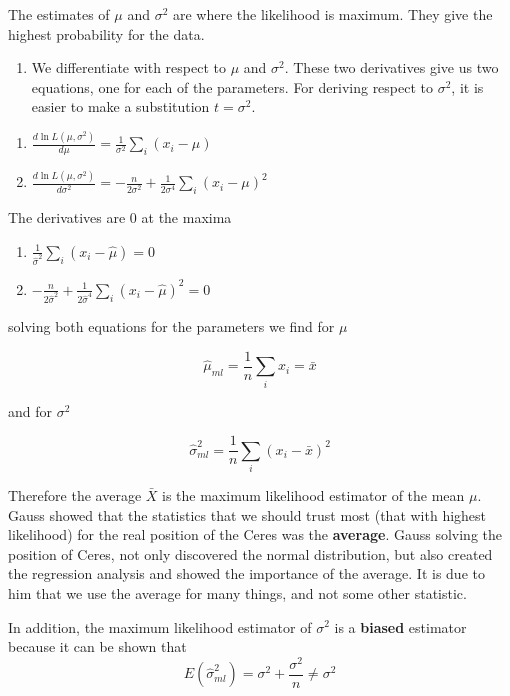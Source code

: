 \documentclass[
]{book}
\providecommand{\tightlist}{%
  \setlength{\itemsep}{0pt}\setlength{\parskip}{0pt}}
\begin{document}
The estimates of \(\mu\) and \(\sigma^2\) are where the likelihood is maximum. They give the highest probability for the data.

\begin{enumerate}
\def\labelenumi{\arabic{enumi}.}
\setcounter{enumi}{2}
\tightlist
\item
  We differentiate with respect to \(\mu\) and \(\sigma^2\). These two derivatives give us two equations, one for each of the parameters. For deriving respect to \(\sigma^2\), it is easier to make a substitution \(t=\sigma^2\).
\end{enumerate}

\begin{enumerate}
\def\labelenumi{\alph{enumi})}
\item
  \(\frac{d \ln L(\mu, \sigma^2)}{d\mu}=\frac{1}{\sigma^2} \sum_i(x_i-\mu)\)
\item
  \(\frac{d \ln L(\mu, \sigma^2)}{d\sigma^2}=-\frac{n}{2 \sigma^2}+\frac{1}{2\sigma^4} \sum_i(x_i-\mu)^2\)
\end{enumerate}

The derivatives are \(0\) at the maxima

\begin{enumerate}
\def\labelenumi{\alph{enumi})}
\tightlist
\item
  \(\frac{1}{\hat{\sigma}^2} \sum_i(x_i-\hat{\mu})=0\)
\item
  \(-\frac{n}{2 \hat{\sigma}^2}+\frac{1}{2\hat{\sigma}^4} \sum_i(x_i-\hat{\mu})^2=0\)
\end{enumerate}

solving both equations for the parameters we find for \(\mu\)

\[\hat{\mu}_{ml}=\frac{1}{n}\sum_i x_i=\bar{x}\]

and for \(\sigma^2\)

\[\hat{\sigma}^2_{ml}=\frac{1}{n}\sum_i(x_i-\bar{x})^2\]

Therefore the average \(\bar{X}\) is the maximum likelihood estimator of the mean \(\mu\). Gauss showed that the statistics that we should trust most (that with highest likelihood) for the real position of the Ceres was the \textbf{average}. Gauss solving the position of Ceres, not only discovered the normal distribution, but also created the regression analysis and showed the importance of the average. It is due to him that we use the average for many things, and not some other statistic.

In addition, the maximum likelihood estimator of \(\sigma^2\) is a \textbf{biased} estimator because it can be shown that \[E(\hat{\sigma}^2_{ml})=\sigma^2+\frac{\sigma^2}{n}\neq \sigma^2\]
\end{document}
